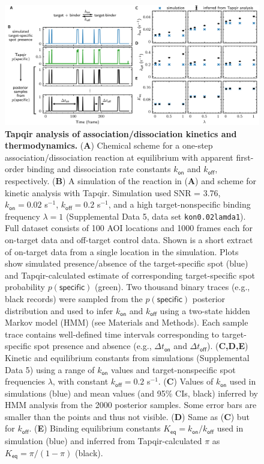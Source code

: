 \begin{figure}
\begin{fullwidth}
\includegraphics[width=183mm]{figures/kinetic_analysis.png}
\caption{\textbf{Tapqir analysis of association/dissociation kinetics and thermodynamics.} (\textbf{A}) Chemical scheme for a one-step association/dissociation reaction at equilibrium with apparent first-order binding and dissociation rate constants $k_{\mathsf{on}}$ and $k_{\mathsf{off}}$, respectively. (\textbf{B}) A simulation of the reaction in (\textbf{A}) and scheme for kinetic analysis with Tapqir. Simulation used SNR = 3.76, $k_\mathsf{on} = 0.02$ s$^{-1}$, $k_\mathsf{off} = 0.2$ s$^{-1}$, and a high target-nonspecific binding frequency $\lambda = 1$ (Supplemental Data 5, data set \texttt{kon0.02lamda1}). Full dataset consists of 100 AOI locations and 1000 frames each for on-target data and off-target control data. Shown is a short extract of on-target data from a single location in the simulation.  Plots show simulated presence/absence of the target-specific spot (blue) and Tapqir-calculated estimate of corresponding target-specific spot probability $p(\mathsf{specific})$ (green). Two thousand binary traces (e.g., black records) were sampled from the $p(\mathsf{specific})$ posterior distribution and used to infer $k_\mathsf{on}$ and $k_\mathsf{off}$ using a two-state hidden Markov model (HMM) (see Materials and Methods). Each sample trace contains well-defined time intervals corresponding to target-specific spot presence and absence (e.g., $\Delta t_\mathsf{on}$ and $\Delta t_\mathsf{off}$). (\textbf{C,D,E}) Kinetic and equilibrium constants from simulations (Supplemental Data 5) using a range of $k_\mathsf{on}$ values and  target-nonspecific spot frequencies $\lambda$, with constant $k_\mathsf{off} = 0.2$ s$^{-1}$. (\textbf{C}) Values of $k_{\mathsf{on}}$ used in simulations (blue) and mean values (and 95\% CIs, black) inferred by HMM analysis from the 2000 posterior samples.  Some error bars are smaller than the points and thus not visible. (\textbf{D}) Same as (\textbf{C}) but for $k_{\mathsf{off}}$. (\textbf{E})  Binding equilibrium constants $K_{\mathsf{eq}} = k_{\mathsf{on}} / k_{\mathsf{off}}$ used in simulation (blue) and inferred from Tapqir-calculated $\pi$ as $K_{\mathsf{eq}} = \pi / (1 - \pi)$ (black). }
\label{fig:kinetic_analysis}
\end{fullwidth}
\end{figure}
